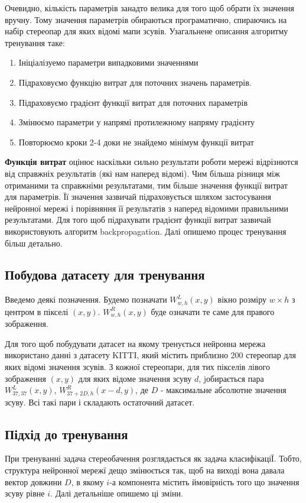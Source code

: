 \documentclass{article}
\theoremstyle{definition}
\begin{document}
Очевидно, кількість параметрів занадто велика для того щоб обрати їх значення вручну. 
Тому значення параметрів обираються програматично, спираючись на набір стереопар для яких відомі мапи зсувів. Узагальнене описання алгоритму тренування таке:
\begin{enumerate}
	\item Ініціалізуемо параметри випадковими значеннями
	\item Підраховуємо функцію витрат для поточних значень параметрів. 
	\item Підраховуємо градієнт функції витрат для поточних параметрів
	\item Змінюємо параметри у напрямі протилежному напряму градієнту
	\item Повторюємо кроки 2-4 доки не знайдемо мінімум функції витрат
\end{enumerate}

\textbf{Функція витрат} оцінює наскільки сильно результати роботи мережі відрізнются від справжніх результатів (які нам наперед відомі). Чим більша різниця між отриманими та справжніми результатами, тим більше значення функції витрат для параметрів. Її значення зазвичай підраховується шляхом застосування нейронної мережі і порівняння її результатів з наперед відомими правильними результатами. Для того щоб підрахувати градієнт функції витрат зазвичай використовують алгоритм backpropagation. Далі опишемо процес тренування більш детально.

\subsection{Побудова датасету для тренування}
Введемо деякі позначення. Будемо позначати $W^L_{w,h}(x,y)$ вікно розміру $w \times h$ з центром в пікселі $(x,y)$. $W^R_{w,h}(x,y)$ буде означати те саме для правого зображення.

Для того щоб побудувати датасет на якому тренується нейронна мережа використано данні з датасету KITTI, який містить приблизно 200 стереопар для яких відомі значення зсувів. З кожної стереопари, для тих пікселів лівого зображення $(x, y)$ для яких відоме значення зсуву $d$, jобирається пара $W^L_{37,37}(x,y)$, $W^R_{37 + 2D,h}(x - d,y)$, де $D$ - максимальне абсолютне значення зсуву. Всі такі пари і складають остаточний датасет.

\subsection{Підхід до тренування}
При тренуванні задача стереобачення розглядається як задача класифікаціЇ. Тобто, структура нейронної мережї дещо змінюється так, щоб на виході вона давала вектор довжини $D$, в якому $i$-а компонента містить ймовірність того що значення зсуву рівне $i$. Далі детальніше опишемо ці зміни.
  
\end{document}
